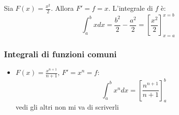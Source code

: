 \begin{esempio}[]
    Sia $F(x)=\frac{x^2}{2}$. Allora $F'=f=x$. L'integrale di $f$ è:
    \begin{equation}
        \int_{a}^{b}xdx=\frac{b^2}{2}-\frac{a^2}{2}=\left[\frac{x^2}{2}\right]^{x=b}_{x=a}
    \end{equation}
\end{esempio}

\subsubsection{Integrali di funzioni comuni}\label{sec:integrali_di_funzioni_comuni}

\begin{itemize}
        \item $F(x)=\frac{x^{n+1}}{n+1}$, $F'=x^n=f$:
        \begin{equation}
            \int_{a}^{b}x^ndx=\left[\frac{n^{n+1}}{n+1}\right]_a^b
        \end{equation}
        vedi gli altri non mi va di scriverli
\end{itemize}




